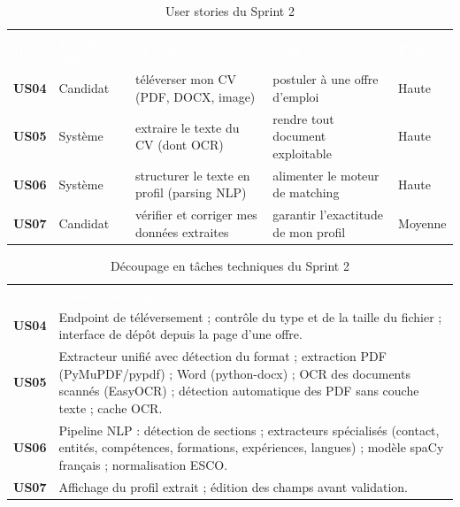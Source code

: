 \documentclass[12pt,a4paper]{report}
\begin{document}
\begin{table}[H]
\centering
\caption{User stories du Sprint 2}
\label{tab:backlog-s2}
\small
\begin{tabularx}{\textwidth}{>{\bfseries}p{0.9cm} p{1.9cm} X X p{1.4cm}}
\rowcolor{tabheader}
\textcolor{white}{\textbf{ID}} & \textcolor{white}{\textbf{En tant que\ldots}} & \textcolor{white}{\textbf{Je veux\ldots}} & \textcolor{white}{\textbf{Afin de\ldots}} & \textcolor{white}{\textbf{Priorité}} \\
US04 & Candidat & téléverser mon CV (PDF, DOCX, image) & postuler à une offre d'emploi & Haute \\
\rowcolor{tabalt}
US05 & Système & extraire le texte du CV (dont OCR) & rendre tout document exploitable & Haute \\
US06 & Système & structurer le texte en profil (parsing NLP) & alimenter le moteur de matching & Haute \\
\rowcolor{tabalt}
US07 & Candidat & vérifier et corriger mes données extraites & garantir l'exactitude de mon profil & Moyenne \\
\bottomrule
\end{tabularx}
\end{table}

\begin{table}[H]
\centering
\caption{Découpage en tâches techniques du Sprint 2}
\label{tab:taches-s2}
\small
\begin{tabularx}{\textwidth}{>{\bfseries}p{1.2cm} X}
\rowcolor{tabheader}
\textcolor{white}{\textbf{US}} & \textcolor{white}{\textbf{Tâches techniques}} \\
US04 & Endpoint de téléversement ; contrôle du type et de la taille du fichier ; interface de dépôt depuis la page d'une offre. \\
\rowcolor{tabalt}
US05 & Extracteur unifié avec détection du format ; extraction PDF (PyMuPDF/pypdf) ; Word (python-docx) ; OCR des documents scannés (EasyOCR) ; détection automatique des PDF sans couche texte ; cache OCR. \\
US06 & Pipeline NLP : détection de sections ; extracteurs spécialisés (contact, entités, compétences, formations, expériences, langues) ; modèle spaCy français ; normalisation ESCO. \\
\rowcolor{tabalt}
US07 & Affichage du profil extrait ; édition des champs avant validation. \\
\bottomrule
\end{tabularx}
\end{table}
\end{document}
